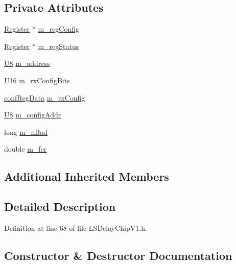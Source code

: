 \subsection*{Private Attributes}
\begin{DoxyCompactItemize}
\item 
\hyperlink{classRegister}{Register} $\ast$ \hyperlink{classLSDelayChipV1_afd1cfdcb114549dc1466c77f07d39fe0}{m\+\_\+reg\+Config}
\item 
\hyperlink{classRegister}{Register} $\ast$ \hyperlink{classLSDelayChipV1_aaf118f103e89a35d2c449e8e3ffe8c20}{m\+\_\+reg\+Status}
\item 
\hyperlink{ICECALv3_8h_a3cb25ca6f51f003950f9625ff05536fc}{U8} \hyperlink{classLSDelayChipV1_a6fba278fd2ac602c796b5e5cebf2d2de}{m\+\_\+address}
\item 
\hyperlink{ICECALv3_8h_adf928e51a60dba0df29d615401cc55a8}{U16} \hyperlink{classLSDelayChipV1_ae049797212539b231b9722ae69a0491d}{m\+\_\+rx\+Config\+Bits}
\item 
\hyperlink{structconfRegData}{conf\+Reg\+Data} \hyperlink{classLSDelayChipV1_a4818ac5c0d7ccf2845a01226234bdb67}{m\+\_\+rx\+Config}
\item 
\hyperlink{ICECALv3_8h_a3cb25ca6f51f003950f9625ff05536fc}{U8} \hyperlink{classLSDelayChipV1_ab49ac38bf9e7a41ccb89c6725cfcac3a}{m\+\_\+config\+Addr}
\item 
long \hyperlink{classLSDelayChipV1_a425c69ef8f3d64d93cb1c86b83bbceec}{m\+\_\+n\+Bad}
\item 
double \hyperlink{classLSDelayChipV1_a38d35de6a25fb1394ede2f39a4f25a08}{m\+\_\+fer}
\end{DoxyCompactItemize}
\subsection*{Additional Inherited Members}


\subsection{Detailed Description}


Definition at line 68 of file L\+S\+Delay\+Chip\+V1.\+h.



\subsection{Constructor \& Destructor Documentation}
\mbox{\label{classLSDelayChipV1_a4dbc01a273a6e044b6f163e12e136134}} 
